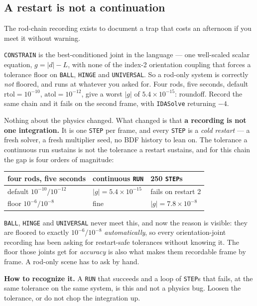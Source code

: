 \documentclass[11pt]{article}
\newcommand{\kw}[1]{\texttt{\uppercase{#1}}}
\newcommand{\code}[1]{\texttt{#1}}
\begin{document}
\subsection{A restart is not a continuation}

The rod-chain recording exists to document a trap that costs an
afternoon if you meet it without warning.

\kw{constrain} is the best-conditioned joint in the language --- one
well-scaled scalar equation, $g = |d| - L$, with none of the index-2
orientation coupling that forces a tolerance floor on \kw{ball},
\kw{hinge} and \kw{universal}. So a rod-only system is correctly
\emph{not} floored, and runs at whatever you asked for. Four rods, five
seconds, default $\mathrm{rtol} = 10^{-10}$, $\mathrm{atol} =
10^{-12}$, give a worst $|g|$ of $5.4\times10^{-15}$: roundoff. Record
the same chain and it fails on the second frame, with \code{IDASolve}
returning $-4$.

Nothing about the physics changed. What changed is that \textbf{a
recording is not one integration.} It is one \kw{step} per frame, and
every \kw{step} is a \emph{cold restart} --- a fresh solver, a fresh
multiplier seed, no BDF history to lean on. The tolerance a continuous
run sustains is not the tolerance a restart sustains, and for this
chain the gap is four orders of magnitude:

\begin{center}
\begin{tabular}{p{5.0cm}p{3.6cm}p{4.0cm}}
\textbf{four rods, five seconds} & \textbf{continuous \kw{run}} &
\textbf{250 \kw{step}s}\\\hline
default $10^{-10} / 10^{-12}$ & $|g| = 5.4\times10^{-15}$ & fails on
restart 2\\
floor $10^{-6} / 10^{-8}$ & fine & $|g| = 7.8\times10^{-8}$\\
\end{tabular}
\end{center}

\kw{ball}, \kw{hinge} and \kw{universal} never meet this, and now the
reason is visible: they are floored to exactly $10^{-6} / 10^{-8}$
\emph{automatically}, so every orientation-joint recording has been
asking for restart-safe tolerances without knowing it. The floor those
joints get for \emph{accuracy} is also what makes them recordable frame
by frame. A rod-only scene has to ask by hand.

\textbf{How to recognize it.} A \kw{run} that succeeds and a loop of
\kw{step}s that fails, at the same tolerance on the same system, is
this and not a physics bug. Loosen the tolerance, or do not chop the
integration up.
\end{document}
